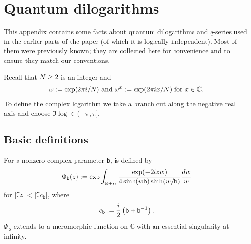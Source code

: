 \documentclass{sl2ams}
\numberwithin{equation}{section}
\newcommand{\CC}{\mathbb{C}}
\begin{document}
\appendix
\section{Quantum dilogarithms}
\label{sec:quantum-dilogarithms}
This appendix contains some facts about quantum dilogarithms and \(q\)-series used in the earlier parts of the paper (of which it is logically independent).
Most of them were previously known; they are collected here for convenience and to ensure they match our conventions.

Recall that \(N \ge 2\) is an integer and
\[
  \omega \defeq \exp(2\pi i /\nr) \text{ and } \omega^{x} \defeq \exp(2\pi i x/\nr) \text{ for } x \in \CC.
\]
To define the complex logarithm we take a branch cut along the negative real axis and choose \(\Im \log \in (-\pi, \pi]\).

\subsection{Basic definitions}
\label{sec:qlog-definitions}
For a nonzero complex parameter \(\mathsf b\),  is defined by
\begin{equation}
  \Phi_{\mathsf b}(z) \mathrel{:=}
  \exp
  \int_{\mathbb{R} + i\epsilon}
  \frac{
    \exp(-2izw)
  }{
    4 \sinh(w \mathsf b ) \sinh(w/\mathsf b)
  }
  \frac{dw}{w}
\end{equation}
for \(|\Im z| < |\Im c_{\mathsf b}|\), where
\begin{equation}
  c_{\mathsf b} \mathrel{:=} \frac{i}{2} \left( \mathsf b + \mathsf b^{-1}\right).
\end{equation}
\(\Phi_{\mathsf b}\) extends to a meromorphic function on \(\CC\) with an essential singularity at infinity.
\end{document}
